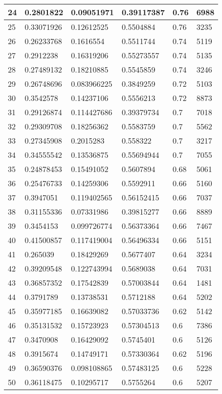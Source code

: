 \begin{longtable}{|l|l|l|l|l|l|}
24 & 0.2801822 & 0.09051971 & 0.39117387 & 0.76 & 6988 \\ \hline 
25 & 0.33071926 & 0.12612525 & 0.5504884 & 0.76 & 3235 \\ \hline 
26 & 0.26233768 & 0.1616554 & 0.5511744 & 0.74 & 5119 \\ \hline 
27 & 0.2912238 & 0.16319206 & 0.55273557 & 0.74 & 5135 \\ \hline 
28 & 0.27489132 & 0.18210885 & 0.5545859 & 0.74 & 3246 \\ \hline 
29 & 0.26748696 & 0.083966225 & 0.3849259 & 0.72 & 5103 \\ \hline 
30 & 0.3542578 & 0.14237106 & 0.5556213 & 0.72 & 8873 \\ \hline 
31 & 0.29126874 & 0.114427686 & 0.39379734 & 0.7 & 7018 \\ \hline 
32 & 0.29309708 & 0.18256362 & 0.5583759 & 0.7 & 5562 \\ \hline 
33 & 0.27345908 & 0.2015283 & 0.558322 & 0.7 & 3217 \\ \hline 
34 & 0.34555542 & 0.13536875 & 0.55694944 & 0.7 & 7055 \\ \hline 
35 & 0.24878453 & 0.15491052 & 0.5607894 & 0.68 & 5061 \\ \hline 
36 & 0.25476733 & 0.14259306 & 0.5592911 & 0.66 & 5160 \\ \hline 
37 & 0.3947051 & 0.119402565 & 0.56152415 & 0.66 & 7037 \\ \hline 
38 & 0.31155336 & 0.07331986 & 0.39815277 & 0.66 & 8889 \\ \hline 
39 & 0.3454153 & 0.099726774 & 0.56373364 & 0.66 & 7467 \\ \hline 
40 & 0.41500857 & 0.117419004 & 0.56496334 & 0.66 & 5151 \\ \hline 
41 & 0.265039 & 0.18429269 & 0.5677407 & 0.64 & 3234 \\ \hline 
42 & 0.39209548 & 0.122743994 & 0.5689038 & 0.64 & 7031 \\ \hline 
43 & 0.36857352 & 0.17542839 & 0.57003844 & 0.64 & 1481 \\ \hline 
44 & 0.3791789 & 0.13738531 & 0.5712188 & 0.64 & 5202 \\ \hline 
45 & 0.35977185 & 0.16639082 & 0.57033736 & 0.62 & 5142 \\ \hline 
46 & 0.35131532 & 0.15723923 & 0.57304513 & 0.6 & 7386 \\ \hline 
47 & 0.3470908 & 0.16429092 & 0.5745401 & 0.6 & 5126 \\ \hline 
48 & 0.3915674 & 0.14749171 & 0.57330364 & 0.62 & 5196 \\ \hline 
49 & 0.36590376 & 0.098108865 & 0.57483125 & 0.6 & 5228 \\ \hline 
50 & 0.36118475 & 0.10295717 & 0.5755264 & 0.6 & 5207 \\ \hline 
\end{longtable}